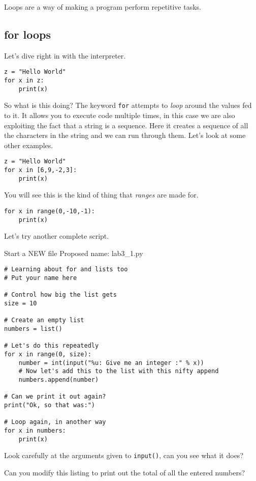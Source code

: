 \documentclass[12pt,oneside]{cttutorial}
\begin{document}
Loops are a way of making a program perform repetitive tasks.

\subsection{for loops}

Let's dive right in with the interpreter.

\begin{lstlisting}
z = "Hello World"
for x in z:
    print(x)
\end{lstlisting}

So what is this doing? The keyword \lstinline!for! attempts to \emph{loop} around the values fed to it. It allows you to execute code multiple times, in this case we are also exploiting the fact that a string is a sequence. Here it creates a sequence of all the characters in the string and we can run through them. Let's look at some other examples.

\begin{lstlisting}
z = "Hello World"
for x in [6,9,-2,3]:
    print(x)
\end{lstlisting}

You will see this is the kind of thing that \emph{ranges} are made for.

\begin{lstlisting}
for x in range(0,-10,-1):
    print(x)
\end{lstlisting}

Let's try another complete script.

\alert{Start a NEW file}
Proposed name: lab3\_1.py
\begin{lstlisting}
# Learning about for and lists too
# Put your name here

# Control how big the list gets
size = 10

# Create an empty list
numbers = list()

# Let's do this repeatedly
for x in range(0, size):
    number = int(input("%u: Give me an integer :" % x))
    # Now let's add this to the list with this nifty append
    numbers.append(number)

# Can we print it out again?
print("Ok, so that was:")

# Loop again, in another way
for x in numbers:
    print(x)
\end{lstlisting}

Look carefully at the arguments given to \lstinline!input()!, can you see what it does?

Can you modify this listing to print out the total of all the entered numbers?
\end{document}
